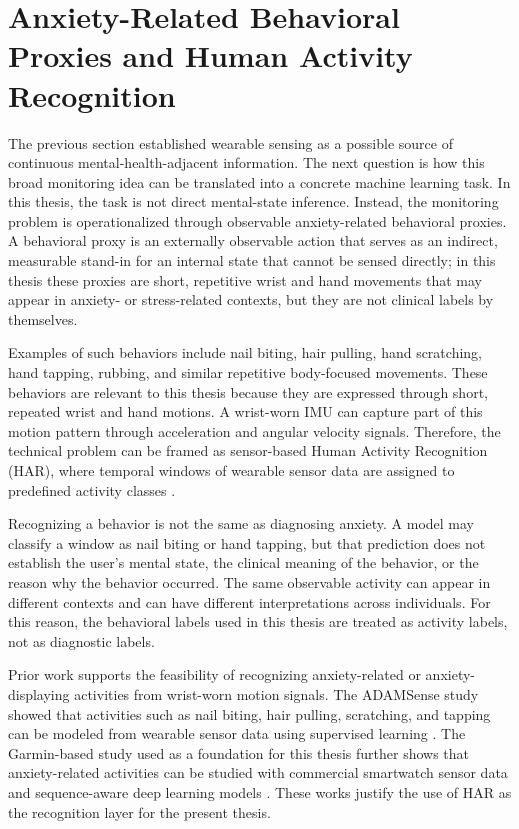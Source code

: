 \section{Anxiety-Related Behavioral Proxies and Human Activity Recognition}

The previous section established wearable sensing as a possible source of continuous mental-health-adjacent information. The next question is how this broad monitoring idea can be translated into a concrete machine learning task. In this thesis, the task is not direct mental-state inference. Instead, the monitoring problem is operationalized through observable anxiety-related behavioral proxies. A behavioral proxy is an externally observable action that serves as an indirect, measurable stand-in for an internal state that cannot be sensed directly; in this thesis these proxies are short, repetitive wrist and hand movements that may appear in anxiety- or stress-related contexts, but they are not clinical labels by themselves.

Examples of such behaviors include nail biting, hair pulling, hand scratching, hand tapping, rubbing, and similar repetitive body-focused movements. These behaviors are relevant to this thesis because they are expressed through short, repeated wrist and hand motions. A wrist-worn IMU can capture part of this motion pattern through acceleration and angular velocity signals. Therefore, the technical problem can be framed as sensor-based Human Activity Recognition (HAR), where temporal windows of wearable sensor data are assigned to predefined activity classes \cite{lara2013survey,bulling2014tutorial,bao2004activity}.

Recognizing a behavior is not the same as diagnosing anxiety. A model may classify a window as nail biting or hand tapping, but that prediction does not establish the user's mental state, the clinical meaning of the behavior, or the reason why the behavior occurred. The same observable activity can appear in different contexts and can have different interpretations across individuals. For this reason, the behavioral labels used in this thesis are treated as activity labels, not as diagnostic labels.

Prior work supports the feasibility of recognizing anxiety-related or anxiety-displaying activities from wrist-worn motion signals. The ADAMSense study showed that activities such as nail biting, hair pulling, scratching, and tapping can be modeled from wearable sensor data using supervised learning \cite{khan2021adamsense,nath2021anxiety}. The Garmin-based study used as a foundation for this thesis further shows that anxiety-related activities can be studied with commercial smartwatch sensor data and sequence-aware deep learning models \cite{oleh2025recognition}. These works justify the use of HAR as the recognition layer for the present thesis.

